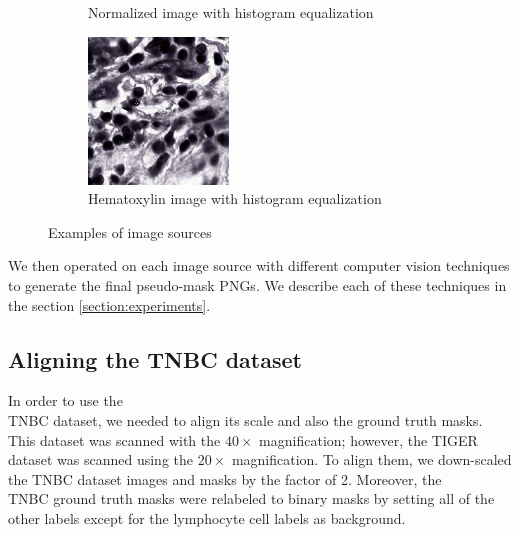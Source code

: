 \begin{figure}[H]
\begin{subfigure}[b]{0.32\textwidth}
    \caption{Normalized image with histogram equalization}\label{fig:tiger-norm-eq}
  \end{subfigure}\hfill
  \begin{subfigure}[b]{0.32\textwidth}
    \centering
    \includegraphics[width=\linewidth]{assets/images/for_presentation/hem_eq_TCGA-EW-A1P8-01Z-00-DX1.E9852193-8CDD-49EF-B49B-DA6931198F0D_[8391, 13690, 8532, 13838].png}
    \caption{Hematoxylin image with histogram equalization}\label{fig:tiger-hem-eq}
  \end{subfigure}
  \caption{Examples of image sources}
  \label{fig:tiger-sources}
\end{figure}


We then operated on each image source with different computer vision techniques to generate the final pseudo-mask PNGs. We describe each of these techniques in the section \ref{section:experiments}. 

\subsection{Aligning the TNBC dataset} 
In order to use the \\ 
TNBC dataset, we needed to align its scale and also the ground truth masks. This dataset was scanned with the $40\times$ magnification; however, the TIGER dataset was scanned using the $20\times$ magnification. To align them, we down-scaled the TNBC dataset images and masks by the factor of 2. Moreover, the 
\\ TNBC ground truth masks were relabeled to binary masks by setting all of the other labels except for the lymphocyte cell labels as background.

